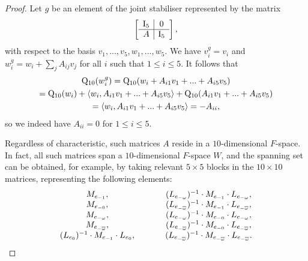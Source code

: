 \begin{proof}
Let $g$ be an element of the joint
stabiliser represented by the matrix
	\begin{equation*}
		\left[
			\begin{array}{c|c}
				\mathord{\mathrm{I}}_5 & 0 \\ \hline
				A & \mathord{\mathrm{I}}_5
			\end{array}
		\right],
	\end{equation*}
	with respect to the basis $v_1,...,v_5, w_1,...,w_5$. We have $v_i^g = v_i$ and $w_i^g = w_i + \sum_j A_{i j} v_j$ for all $i$ such that
	$1 \leqslant i \leqslant 5$. It follows that 
	\begin{multline*}
		\mathord{\mathrm{Q}}_{10}(w_i^g) = \mathord{\mathrm{Q}}_{10}(w_i + A_{i 1} v_1 + ... + A_{i 5} v_5) \\
		    =\mathord{\mathrm{Q}}_{10}(w_i) + \langle w_i, A_{i 1} v_1 + ... + A_{i 5} v_5 \rangle + \mathord{\mathrm{Q}}_{10}(A_{i 1} v_1 + ... + A_{i 5} v_5) \\
		    = \langle w_i, A_{i 1} v_1 + ... + A_{i 5} v_5 \rangle  = -A_{ii},
	\end{multline*}
	so we indeed have $A_{i i} = 0$ for $1 \leqslant i \leqslant 5$. 
	
	Regardless of characteristic, such matrices $A$ reside
	in a $10$-dimensional $F$-space. 
	In fact, all such matrices
	span a $10$-dimensional $F$-space $W$, and the spanning set
	can be obtained, for example, by taking relevant 
	$5 \times 5$ blocks in the $10 \times 10$ matrices, 
	representing the following elements:
\begin{equation*}
	\begin{array}{c@{\ \ \ \ \ \ \ \ \ \ \ }c}
M_{e_{-1}},&
	(L_{e_{-\omega}})^{-1}\cdot M_{e_{-1}}\cdot L_{e_{-\omega}}, \\

M_{e_{-0}},&
	(L_{e_{-\bar{\omega}}})^{-1}\cdot M_{e_{-1}}\cdot L_{e_{-\bar{\omega}}}, \\
	
M_{e_{-\omega}},&
	(L_{e_{-\omega}})^{-1}\cdot M_{e_{-0}}\cdot L_{e_{-\omega}}, \\
	
M_{e_{-\bar{\omega}}},&
	(L_{e_{-\bar{\omega}}})^{-1}\cdot M_{e_{-0}}\cdot L_{e_{-\bar{\omega}}}, \\
	

(L_{e_{0}})^{-1}\cdot M_{e_{-1}}\cdot L_{e_{0}}, &

(L_{e_{-\bar{\omega}}})^{-1}\cdot M_{e_{-\bar{\omega}}}\cdot L_{e_{-\bar{\omega}}}.
	\end{array}
\end{equation*}


\end{proof}
